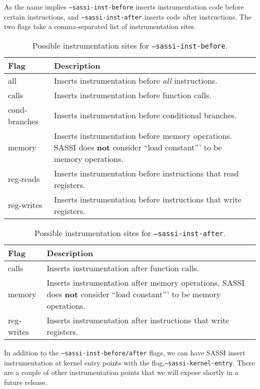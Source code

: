 As the name implies \texttt{--sassi-inst-before} inserts
instrumentation code before certain instructions, and
\texttt{--sassi-inst-after} inserts code after instructions.  The two
flags take a comma-separated list of instrumentation sites.

\begin{table}[h]
\centering
\begin{tabular}{|l|l|}
\hline
Flag & Description \\
\hline
all & Inserts instrumentation before \emph{all} instructions. \\
calls & Inserts instrumentation before function calls. \\
cond-branches & Inserts instrumentation before conditional branches. \\
memory & Inserts instrumentation before memory operations.  SASSI does {\bf not} consider ``load constant''' to be memory operations. \\
reg-reads & Inserts instrumentation before instructions that read
registers. \\
reg-writes & Inserts instrumentation before instructions that write
registers. \\
\hline
\end{tabular}
\caption{Possible instrumentation sites for \texttt{--sassi-inst-before}.}
\label{tab:inst-before}
\end{table}

\begin{table}[h]
\centering
\begin{tabular}{|l|l|}
\hline
Flag & Description \\
\hline
calls & Inserts instrumentation after function calls. \\
memory & Inserts instrumentation after memory operations. SASSI does {\bf not} consider ``load constant''' to be memory operations. \\
reg-writes & Inserts instrumentation after instructions that write
registers. \\
\hline
\end{tabular}
\caption{Possible instrumentation sites for \texttt{--sassi-inst-after}.}
\label{tab:inst-after}
\end{table}

In addition to the \texttt{--sassi-inst-before/after} flags, we can
have SASSI insert instrumentation at kernel entry points with the
flag,\texttt{--sassi-kernel-entry}.  There are a couple of other
instrumentation points that we will expose shortly in a future release.

